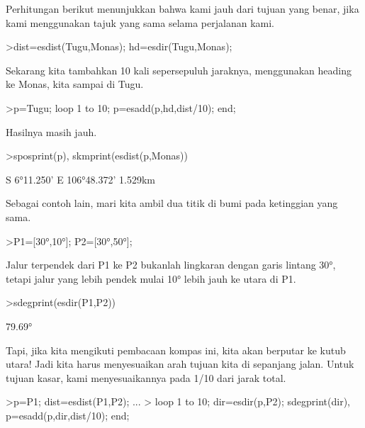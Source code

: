 \documentclass[12pt,Times new roman,letterpaper]{book}
\begin{document}
\begin{eulernootebook}
\begin{eulercomment}
\begin{eulercomment}
\begin{eulernootebook}
\begin{eulercomment}
\begin{eulercomment}
\begin{eulercomment}
\begin{eulercomment}
\begin{eulercomment}
\begin{eulercomment}
\begin{eulernotebook}
\begin{eulercomment}
\begin{eulercomment}
\begin{eulercomment}
\begin{eulercomment}
\begin{eulercomment}
\begin{eulercomment}
Perhitungan berikut menunjukkan bahwa kami jauh dari tujuan yang
benar, jika kami menggunakan tajuk yang sama selama perjalanan kami.
\end{eulercomment}
\begin{eulerprompt}
>dist=esdist(Tugu,Monas); hd=esdir(Tugu,Monas);
\end{eulerprompt}
\begin{eulercomment}
Sekarang kita tambahkan 10 kali sepersepuluh jaraknya, menggunakan
heading ke Monas, kita sampai di Tugu.
\end{eulercomment}
\begin{eulerprompt}
>p=Tugu; loop 1 to 10; p=esadd(p,hd,dist/10); end;
\end{eulerprompt}
\begin{eulercomment}
Hasilnya masih jauh.
\end{eulercomment}
\begin{eulerprompt}
>sposprint(p), skmprint(esdist(p,Monas))
\end{eulerprompt}
\begin{euleroutput}
  S 6°11.250' E 106°48.372'
       1.529km
\end{euleroutput}
\begin{eulercomment}
Sebagai contoh lain, mari kita ambil dua titik di bumi pada ketinggian
yang sama.
\end{eulercomment}
\begin{eulerprompt}
>P1=[30°,10°]; P2=[30°,50°];
\end{eulerprompt}
\begin{eulercomment}
Jalur terpendek dari P1 ke P2 bukanlah lingkaran dengan garis lintang
30°, tetapi jalur yang lebih pendek mulai 10° lebih jauh ke utara di
P1.
\end{eulercomment}
\begin{eulerprompt}
>sdegprint(esdir(P1,P2))
\end{eulerprompt}
\begin{euleroutput}
       79.69°
\end{euleroutput}
\begin{eulercomment}
Tapi, jika kita mengikuti pembacaan kompas ini, kita akan berputar ke
kutub utara! Jadi kita harus menyesuaikan arah tujuan kita di
sepanjang jalan. Untuk tujuan kasar, kami menyesuaikannya pada 1/10
dari jarak total.
\end{eulercomment}
\begin{eulerprompt}
>p=P1;  dist=esdist(P1,P2); ...
>  loop 1 to 10; dir=esdir(p,P2); sdegprint(dir), p=esadd(p,dir,dist/10); end;

\end{eulerprompt}
\end{eulercomment}
\end{eulercomment}
\end{eulercomment}
\end{eulercomment}
\end{eulercomment}
\end{eulernotebook}
\end{eulercomment}
\end{eulercomment}
\end{eulercomment}
\end{eulercomment}
\end{eulercomment}
\end{eulercomment}
\end{eulernootebook}
\end{eulercomment}
\end{eulercomment}
\end{eulernootebook}
\end{document}
